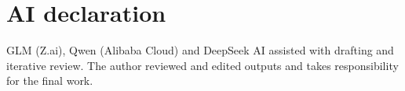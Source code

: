 \documentclass[10pt,twocolumn]{article}
\theoremstyle{plain}
\theoremstyle{remark}
\begin{document}
\section*{AI declaration}
GLM (Z.ai), Qwen (Alibaba Cloud) and DeepSeek AI assisted with drafting
and iterative review. The author reviewed and edited outputs and takes
responsibility for the final work.
\end{document}
